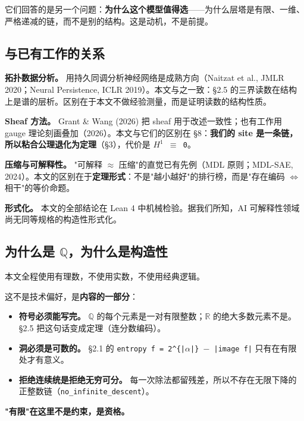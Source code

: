 \documentclass[11pt,a4paper]{ctexart}
\begin{document}
它们回答的是另一个问题：\textbf{为什么这个模型值得选}——为什么层塔是有限、一维、严格递减的链，而不是别的结构。这是动机，不是前提。

\subsection{与已有工作的关系}

\textbf{拓扑数据分析。} 用持久同调分析神经网络是成熟方向（Naitzat et al., JMLR 2020；Neural Persistence, ICLR 2019）。本文与之一致：§2.5 的三界读数在结构上是谱的层析。区别在于本文不做经验测量，而是证明读数的结构性质。

\textbf{Sheaf 方法。} Grant \& Wang (2026) 把 sheaf 用于改述一致性；也有工作用 gauge 理论刻画叠加（2026）。本文与它们的区别在 §8：\textbf{我们的 site 是一条链，所以粘合公理退化为定理}（§3），代价是 \texttt{\ensuremath{H^{1}} \ensuremath{\equiv} 0}。

\textbf{压缩与可解释性。} "可解释 \ensuremath{\approx} 压缩"的直觉已有先例（MDL 原则；MDL-SAE, 2024）。本文的区别在于\textbf{定理形式}：不是"越小越好"的排行榜，而是"存在编码 \ensuremath{\Longleftrightarrow} 相干"的等价命题。

\textbf{形式化。} 本文的全部结论在 Lean 4 中机械检验。据我们所知，AI 可解释性领域尚无同等规格的构造性形式化。

\subsection{为什么是 \ensuremath{\mathbb{Q}}，为什么是构造性}

本文全程使用有理数，不使用实数，不使用经典逻辑。

这不是技术偏好，是\textbf{内容的一部分}：

\begin{itemize}
\item \textbf{符号必须能写完。} \ensuremath{\mathbb{Q}} 的每个元素是一对有限整数；\ensuremath{\mathbb{R}} 的绝大多数元素不是。§2.5 把这句话变成定理（连分数编码）。
\item \textbf{洞必须是可数的。} §2.1 的 \texttt{entropy f = 2\textasciicircum{}\{|\ensuremath{\alpha}|\} \ensuremath{-} |image f|} 只有在有限处才有意义。
\item \textbf{拒绝连续统是拒绝无穷可分。} 每一次除法都留残差，所以不存在无限下降的正整数链（\texttt{no\_infinite\_descent}）。
\end{itemize}

\textbf{"有限"在这里不是约束，是资格。}
\end{document}

